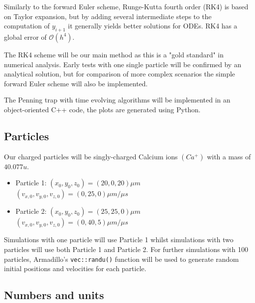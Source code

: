 \documentclass[english,notitlepage,reprint,nofootinbib]{revtex4-1}  %
\begin{document}
    Similarly to the forward Euler scheme, Runge-Kutta fourth order (RK4) is based on Taylor expansion, but by adding several intermediate 
    steps to the computation of $y_{i+1}$ it generally yields better solutions for ODEs. RK4 has a global error of $\mathcal{O}(h^4)$.

    The RK4 scheme will be our main method as this is a "gold standard" in numerical analysis. 
    Early tests with one single particle will be confirmed by an analytical solution, but for comparison of more complex 
    scenarios the simple forward Euler scheme will also be implemented.

    The Penning trap with time evolving algorithms will be implemented in an object-oriented C++ code, the plots are generated using Python.
    
    \subsection*{Particles}
    Our charged particles will be singly-charged Calcium ions $(Ca^+)$ with a mass of $40.077 u$.
    \begin{itemize}
        \item Particle 1:
            \subitem $(x_0,y_0,z_0) = (20, 0, 20) \mu m$
            \subitem $(v_{x,0}, v_{y,0}, v_{z,0}) = (0, 25, 0) \mu m / \mu s$  
        \item Particle 2:
            \subitem $(x_0,y_0,z_0) = (25, 25, 0) \mu m$
            \subitem $(v_{x,0}, v_{y,0}, v_{z,0}) = (0, 40, 5) \mu m / \mu s$  
    \end{itemize}
    Simulations with one particle will use Particle 1 whilst simulations with two particles will use both Particle 1 and Particle 2.
    For further simulations with 100 particles, Armadillo's \texttt{vec::randu()} function will be used to generate random initial 
    positions and velocities for each particle.

    \subsection*{Numbers and units}
\end{document}
